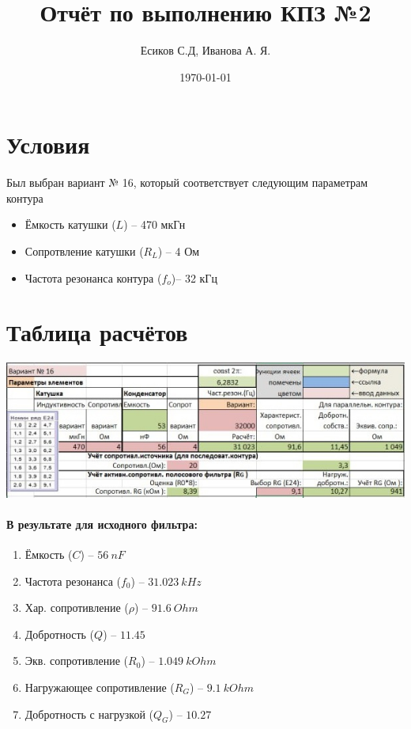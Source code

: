 \documentclass[12pt,a4paper]{article}
\title{Отчёт по выполнению КПЗ №2}
\author{Есиков С.Д, Иванова А. Я.}
\date{\today}
\begin{document}
	\maketitle
	
	\section*{Условия}
	Был выбран вариант № 16, который соответствует следующим параметрам контура
	\begin{itemize}
		\item Ёмкость катушки ($L$) -- 470 мкГн
		\item Сопротвление катушки ($R_L$) -- 4 Ом
		\item Частота резонанса контура ($f_o$)-- 32 кГц
	\end{itemize}
	\newpage
	
	\centering
	
	\section*{Таблица расчётов}
	
	\includegraphics[width=0.7\linewidth]{src/calculate}

	\paragraph*{В результате для исходного фильтра:}
	\begin{enumerate}
		\item Ёмкость ($C$) -- $56 \: nF$
		\item Частота резонанса ($f_0$) -- $31.023 \: kHz$
		\item Хар. сопротивление ($\rho$) -- $91.6 \: Ohm$
		\item Добротность ($Q$) -- $11.45$
		\item Экв. сопротивление ($R_0$) -- $1.049 \: kOhm$
		\item Нагружающее сопротивление ($R_G$) -- $9.1 \: kOhm$
		\item Добротность с нагрузкой ($Q_G$) -- $10.27$
	\end{enumerate}
\end{document}

